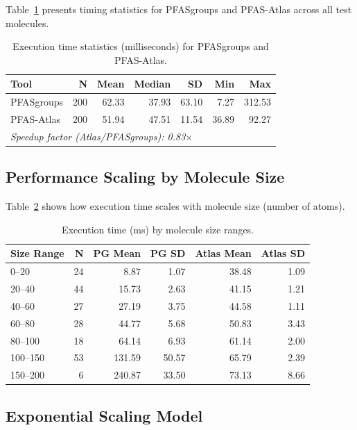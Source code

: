 Table~\ref{tab:timing_overall} presents timing statistics for PFASgroups and PFAS-Atlas across all test molecules.

\begin{table}[htbp]
\centering
\caption{Execution time statistics (milliseconds) for PFASgroups and PFAS-Atlas.}
\label{tab:timing_overall}
\begin{tabular}{lrrrrrr}
\toprule
\textbf{Tool} & \textbf{N} & \textbf{Mean} & \textbf{Median} & \textbf{SD} & \textbf{Min} & \textbf{Max} \\
\midrule
PFASgroups & 200 & 62.33 & 37.93 & 63.10 & 7.27 & 312.53 \\
PFAS-Atlas & 200 & 51.94 & 47.51 & 11.54 & 36.89 & 92.27 \\
\midrule
\multicolumn{7}{l}{\textit{Speedup factor (Atlas/PFASgroups): 0.83$\times$}} \\
\bottomrule
\end{tabular}
\end{table}

\subsection*{Performance Scaling by Molecule Size}

Table~\ref{tab:timing_by_size} shows how execution time scales with molecule size (number of atoms).

\begin{table}[htbp]
\centering
\caption{Execution time (ms) by molecule size ranges.}
\label{tab:timing_by_size}
\begin{tabular}{lrrrrr}
\toprule
\textbf{Size Range} & \textbf{N} & \textbf{PG Mean} & \textbf{PG SD} & \textbf{Atlas Mean} & \textbf{Atlas SD} \\
\midrule
0--20 & 24 & 8.87 & 1.07 & 38.48 & 1.09 \\
20--40 & 44 & 15.73 & 2.63 & 41.15 & 1.21 \\
40--60 & 27 & 27.19 & 3.75 & 44.58 & 1.11 \\
60--80 & 28 & 44.77 & 5.68 & 50.83 & 3.43 \\
80--100 & 18 & 64.14 & 6.93 & 61.14 & 2.00 \\
100--150 & 53 & 131.59 & 50.57 & 65.79 & 2.39 \\
150--200 & 6 & 240.87 & 33.50 & 73.13 & 8.66 \\
\bottomrule
\end{tabular}
\end{table}

\subsection*{Exponential Scaling Model}

